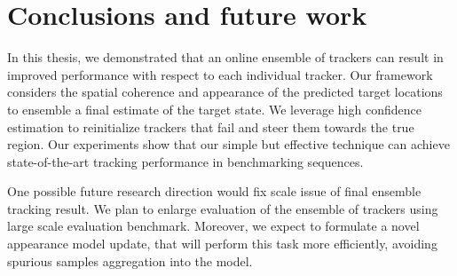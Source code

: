 \chapter{Conclusions and future work}
\label{chapter::conclusions}

In this thesis, we demonstrated that an online ensemble of trackers can result
in improved performance with respect to each individual tracker. Our framework
considers the spatial coherence and appearance of the predicted target locations
to ensemble a final estimate of the target state. We leverage high confidence
estimation to reinitialize trackers that fail and steer them towards the true
region. Our experiments show that our simple but effective technique can achieve
state-of-the-art tracking performance in benchmarking sequences.

One possible future research direction would fix scale issue of final ensemble
tracking result. We plan to enlarge evaluation of the ensemble of trackers
using large scale evaluation benchmark. Moreover, we expect to formulate a novel
appearance model update, that will perform this task more efficiently, avoiding
spurious samples aggregation into the model.